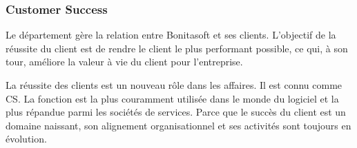 \subsubsection{Customer Success}
Le département gère la relation entre Bonitasoft et ses clients. L'objectif de la réussite du client est de rendre le client le plus performant possible, ce qui, à son tour, améliore la valeur à vie du client pour l'entreprise.

La réussite des clients est un nouveau rôle dans les affaires. Il est connu comme CS. La fonction est la plus couramment utilisée dans le monde du logiciel et la plus répandue parmi les sociétés de services. Parce que le succès du client est un domaine naissant, son alignement organisationnel et ses activités sont toujours en évolution.
